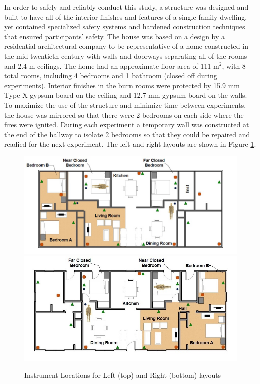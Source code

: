 \documentclass[12pt,oneside]{article}
\begin{document}
In order to safely and reliably conduct this study, a structure was designed and built to have all of the interior finishes and features of a single family dwelling, yet contained specialized safety systems and hardened construction techniques that ensured participants' safety. The house was based on a design by a residential architectural company to be representative of a home constructed in the mid-twentieth century with walls and doorways separating all of the rooms and 2.4 m ceilings. The home had an approximate floor area of 111 m$^2$, with 8 total rooms, including 4 bedrooms and 1 bathroom (closed off during experiments). Interior finishes in the burn rooms were protected by 15.9 mm Type X gypsum board on the ceiling and 12.7 mm gypsum board on the walls. To maximize the use of the structure and minimize time between experiments, the house was mirrored so that there were 2 bedrooms on each side where the fires were ignited.  During each experiment a temporary wall was constructed at the end of the hallway to isolate 2 bedrooms so that they could be repaired and readied for the next experiment. The left and right layouts are shown in Figure \ref{fig:layout}.
\begin{figure}[!ht]
	\centering
	\includegraphics[width=.75\textwidth]{../Images/Left}
	\includegraphics[width=.75\textwidth]{../Images/Right}
	\caption[Structure Layout and Instrument Locations]{Instrument Locations for Left (top) and Right (bottom) layouts}
	\label{fig:layout}
\end{figure}
\end{document}
